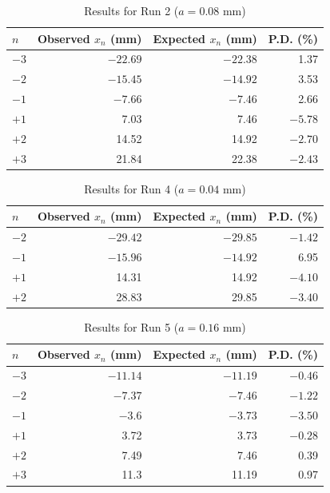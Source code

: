 \newpage
\begin{table}[ht!]
    \centering
    \begin{tabular}{|l|r|r|r|}
        \hline
        $n$ & Observed $x_{n}$ (mm) & Expected $x_{n}$ (mm) & P.D. (\%) \\
        \hline
        $-3$ & $-22.69$ & $-22.38$ & 1.37 \\
        $-2$ & $-15.45$ & $-14.92$ & 3.53 \\
        $-1$ & $-7.66$ & $-7.46$ & 2.66 \\
        \hline
        $+1$ & 7.03 & 7.46 & $-5.78$ \\
        $+2$ & 14.52 & 14.92 & $-2.70$ \\
        $+3$ & 21.84 & 22.38 & $-2.43$ \\
        \hline
    \end{tabular}
    \caption{Results for Run 2 ($a = 0.08$ mm)}
    \label{table.11.results.12}
\end{table}
\begin{table}[ht!]
    \centering
    \begin{tabular}{|l|r|r|r|}
        \hline
        $n$ & Observed $x_{n}$ (mm) & Expected $x_{n}$ (mm) & P.D. (\%) \\
        \hline
        $-2$ & $-29.42$ & $-29.85$ & $-1.42$ \\
        $-1$ & $-15.96$ & $-14.92$ & 6.95 \\
        \hline
        $+1$ & 14.31 & 14.92 & $-4.10$ \\
        $+2$ & 28.83 & 29.85 & $-3.40$ \\
        \hline
    \end{tabular}
    \caption{Results for Run 4 ($a = 0.04$ mm)}
    \label{table.11.results.34}
\end{table}
\begin{table}[ht!]
    \centering
    \begin{tabular}{|l|r|r|r|}
        \hline
        $n$ & Observed $x_{n}$ (mm) & Expected $x_{n}$ (mm) & P.D. (\%) \\
        \hline
        $-3$ & $-11.14$ & $-11.19$ & $-0.46$ \\
        $-2$ & $-7.37$ & $-7.46$ & $-1.22$ \\
        $-1$ & $-3.6$ & $-3.73$ & $-3.50$ \\
        \hline
        $+1$ & 3.72 & 3.73 & $-0.28$ \\
        $+2$ & 7.49 & 7.46 & 0.39 \\
        $+3$ & 11.3 & 11.19 & 0.97 \\
        \hline
    \end{tabular}
    \caption{Results for Run 5 ($a = 0.16$ mm)}
    \label{table.11.results.56}
\end{table}
